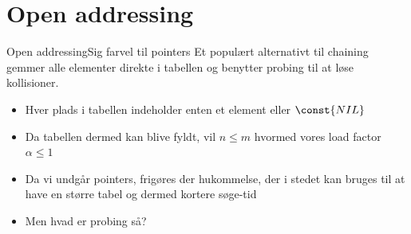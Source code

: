\documentclass[aspectratio=1610]{beamer}
\begin{document}
\section{Open addressing}


\begin{frame}{Open addressing}{Sig farvel til pointers}
    Et populært alternativt til chaining gemmer alle elementer direkte i
    tabellen og benytter \alert{probing} til at løse kollisioner.

    \begin{itemize}[<+(1)->]
        \item Hver plads i tabellen indeholder enten et element eller
            $\const{NIL}$
        \item Da tabellen dermed kan blive fyldt, vil $n \leq m$ hvormed vores
            load factor $\alpha \leq 1$
        \item Da vi undgår pointers, frigøres der hukommelse, der i stedet kan
            bruges til at have en større tabel og dermed kortere søge-tid
        \item Men hvad er \alert{probing} så?
    \end{itemize}
\end{frame}
\end{document}
